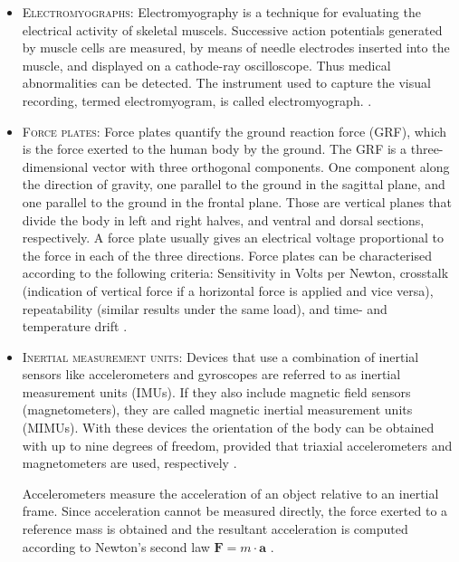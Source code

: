 \begin{itemize}

\item \textsc{Electromyographs:} Electromyography is a technique for evaluating the electrical activity of skeletal muscels. Successive action potentials generated by muscle cells are measured, by means of needle electrodes inserted into the muscle, and displayed on a cathode-ray oscilloscope. Thus medical abnormalities can be detected. The instrument used to capture the visual recording, termed electromyogram, is called electromyograph. \cite{encyclopedia_britannica_electromyography_2014}.

\item \textsc{Force plates:} Force plates quantify the ground reaction force (GRF), which is the force exerted to the human body by the ground. The GRF is a three-dimensional vector with three orthogonal components. One component along the direction of gravity, one parallel to the ground in the sagittal plane, and one parallel to the ground in the frontal plane. Those are vertical planes that divide the body in left and right halves, and ventral and dorsal sections, respectively. A force plate usually gives an electrical voltage proportional to the force in each of the three directions. Force plates can be characterised according to the following criteria: Sensitivity in Volts per Newton, crosstalk (indication of vertical force if a horizontal force is applied and vice versa), repeatability (similar results under the same load), and time- and temperature drift \cite{griffiths_principles_2006}.

\item \textsc{Inertial measurement units:} Devices that use a combination of inertial sensors like accelerometers and gyroscopes are referred to as inertial measurement units (IMUs). If they also include magnetic field sensors (magnetometers), they are called magnetic inertial measurement units (MIMUs). With these devices the orientation of the body can be obtained with up to nine degrees of freedom, provided that triaxial accelerometers and magnetometers are used, respectively \cite{olivares_vicente_signal_2013}.

Accelerometers measure the acceleration of an object relative to an inertial frame. Since acceleration cannot be measured directly, the force exerted to a reference mass is obtained and the resultant acceleration is computed according to Newton's second law $ \mathbf{F} = m \cdot \mathbf a $ \cite{encyclopedia_britannica_accelerometer_2014}.

\end{itemize}

